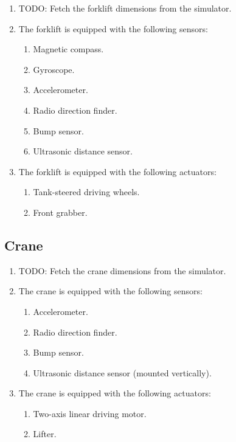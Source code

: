 \begin{enumerate}
  \item TODO: Fetch the forklift dimensions from the simulator.
  \item The forklift is equipped with the following sensors:
  \begin{enumerate}
    \item Magnetic compass.
    \item Gyroscope.
    \item Accelerometer.
    \item Radio direction finder.
    \item Bump sensor.
    \item Ultrasonic distance sensor.
  \end{enumerate}
  \item The forklift is equipped with the following actuators:
  \begin{enumerate}
    \item Tank-steered driving wheels.
    \item Front grabber.
  \end{enumerate}
\end{enumerate}

\subsection{Crane}
\label{spec:crane}

\begin{enumerate}
  \item TODO: Fetch the crane dimensions from the simulator.
  \item The crane is equipped with the following sensors:
  \begin{enumerate}
    \item Accelerometer.
    \item Radio direction finder.
    \item Bump sensor.
    \item Ultrasonic distance sensor (mounted vertically).
  \end{enumerate}
  \item The crane is equipped with the following actuators:
  \begin{enumerate}
    \item Two-axis linear driving motor.
    \item Lifter.
  \end{enumerate}
\end{enumerate}
